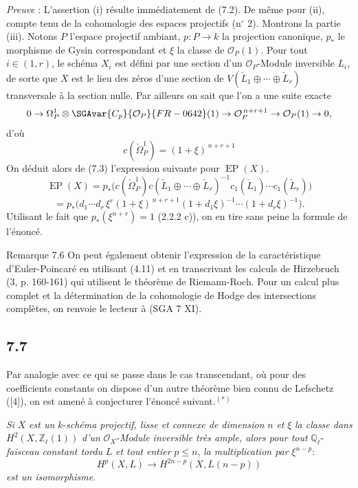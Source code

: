 \emph{Preuve} : L'assertion (i) résulte immédiatement de (7.2). De même pour (ii), compte tenu de la cohomologie des espaces projectifs (n$^\circ$ 2). Montrons la partie (iii). Notons $P$ l'espace projectif ambiant, $p:P\to k$ la projection canonique, $p_*$ le morphisme de Gysin 
correspondant et $\xi$ la classe de $\mathcal{O}_P(1)$. Pour tout $i\in(1,r)$, le schéma $X_i$ est défini par une
section d'un $\mathcal{O}_P$-Module inversible $L_i$, de sorte que $X$ est le lieu des zéros d'une section de $V(\check L_1\oplus\cdots\oplus\check L_r)$ transversale à la section nulle. Par ailleurs on sait que l'on a une suite exacte
\[
0\to\Omega_P^1\otimes\SGAvar{ C_p}{\mathcal{O}_P}{FR-0642}(1)\to\mathcal{O}_P^{\,n+r+1}\to\mathcal{O}_P(1)\to0,
\]
d'où
\[
c(\check\Omega_P^1)=(1+\xi)^{\,n+r+1}
\]
On déduit alors de (7.3) l'expression suivante pour $\operatorname{EP}(X)$.
\[
\operatorname{EP}(X)
=p_*\bigl(c(\check\Omega_P^1)c(\check L_1\oplus\cdots\oplus\check L_r)^{-1}
c_1(\check L_1)\cdots c_1(\check L_r)\bigr)
\]
\[
=p_*\bigl(d_1\cdots d_r\,\xi^r(1+\xi)^{\,n+r+1}
(1+d_1\xi)^{-1}\cdots(1+d_r\xi)^{-1}\bigr).
\]
Utilisant le fait que $p_*(\xi^{n+r})=1$ (2.2.2 c)), on en tire sans peine la formule de l'énoncé.

\begin{statement}{Remarque 7.6}
On peut également obtenir l'expression de la caractéristique d'Euler-Poincaré en utilisant (4.11) et en transcrivant les calculs de Hirzebruch (3, p. 160-161) qui utilisent le théorème de Riemann-Roch. Pour un calcul plus complet et la détermination de la cohomologie de Hodge des intersections complètes, on renvoie le lecteur à (SGA 7 XI).
\end{statement}

\subsection*{7.7}

Par analogie avec ce qui se passe dans le cas transcendant, où pour des coefficients constants on dispose d'un autre théorème bien connu de Lefschetz ([4]), on est amené à conjecturer l'énoncé suivant.$^{(*)}$

 \emph{Si} $X$ \emph{est un} $k$-\emph{schéma projectif, lisse et connexe de dimension} $n$ \emph{et} $\xi$ \emph{la classe dans} $H^2(X,\mathbb{Z}_\ell(1))$ \emph{d'un} $\mathcal{O}_X$-\emph{Module inversible très ample, alors pour tout} $\mathbb{Q}_\ell$-\emph{faisceau constant tordu} $L$ \emph{et tout entier} $p\le n$, \emph{la multiplication par} $\xi^{n-p}$:
\[
H^p(X,L)\to H^{2n-p}(X,L(n-p))
\]
\emph{est un isomorphisme}.

